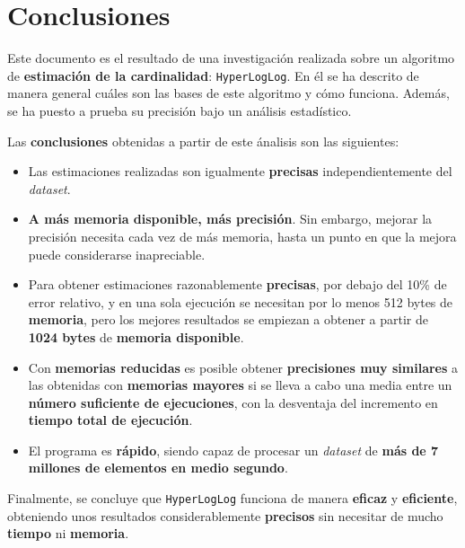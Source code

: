 % 
\section{Conclusiones}
\label{conclusiones}

Este documento es el resultado de una investigación realizada sobre un algoritmo de \textbf{estimación de la cardinalidad}:
\texttt{HyperLogLog}. En él se ha descrito de manera general cuáles son las bases de este algoritmo y cómo funciona. Además, se
ha puesto a prueba su precisión bajo un análisis estadístico.

Las \textbf{conclusiones} obtenidas a partir de este ánalisis son las  siguientes:

\begin{itemize}
	\item Las estimaciones realizadas son igualmente \textbf{precisas} independientemente del \emph{dataset}.
	\item \textbf{A más memoria disponible, más precisión}. Sin embargo, mejorar la precisión necesita cada vez de más memoria, hasta un punto en que la mejora puede considerarse inapreciable.
	\item Para obtener estimaciones razonablemente \textbf{precisas}, por debajo del 10\% de error relativo, y en una sola ejecución se
necesitan por lo menos 512 bytes de \textbf{memoria}, pero los mejores resultados se empiezan a obtener a partir de
\textbf{1024 bytes} de \textbf{memoria disponible}.
	\item Con \textbf{memorias reducidas} es posible obtener \textbf{precisiones muy similares} a las obtenidas con
\textbf{memorias mayores} si se lleva a cabo una media entre un \textbf{número suficiente de ejecuciones}, con la desventaja del
incremento en \textbf{tiempo total de ejecución}.
	\item El programa es \textbf{rápido}, siendo capaz de procesar un \emph{dataset} de \textbf{más de 7 millones de elementos en medio segundo}.
\end{itemize}

Finalmente, se concluye que \texttt{HyperLogLog} funciona de manera \textbf{eficaz} y \textbf{eficiente}, obteniendo unos resultados
considerablemente \textbf{precisos} sin necesitar de mucho \textbf{tiempo} ni \textbf{memoria}.
